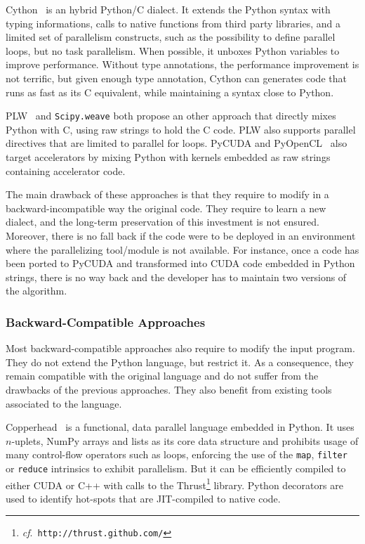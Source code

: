 \documentclass[conference]{IEEEtran}
\begin{document}
Cython~\cite{cython2010} is an hybrid Python/C dialect. It extends the Python
syntax with typing informations, calls to native functions from third party
libraries, and a limited set of parallelism constructs, such as the possibility
to define parallel loops, but no task parallelism. When possible, it unboxes
Python variables to improve performance. Without type annotations, the 
performance improvement is not terrific, but given enough type annotation, Cython can generates code that runs as fast as its C equivalent, while 
maintaining a syntax close to Python.

PLW~\cite{dongara2007} and \texttt{Scipy.weave} both propose an other approach
that directly mixes Python with C, using raw strings to hold the C code. PLW
also supports parallel directives that are limited to parallel for loops.
PyCUDA and PyOpenCL~\cite{klockner2012} also target accelerators by mixing
Python with kernels embedded as raw strings containing accelerator code.

The main drawback of these approaches is that they require to modify in a
backward-incompatible way the original code. They require to learn a new
dialect, and the long-term preservation of this investment is not ensured.
Moreover, there is no fall back if the code were to be deployed in an
environment where the parallelizing tool/module is not available. For instance,
once a code has been ported to PyCUDA and transformed into CUDA code embedded in
Python strings, there is no way back and the developer has to maintain two
versions of the algorithm.

\subsubsection{Backward-Compatible Approaches}

Most backward-compatible approaches also require to modify the input program.
They do not extend the Python language, but restrict it. As a consequence, they
remain compatible with the original language and do not suffer from the
drawbacks of the previous approaches. They also benefit from existing tools
associated to the language.

Copperhead~\cite{copperhead2011} is a functional, data parallel language
embedded in Python. It uses $n$-uplets, NumPy arrays and lists as its core data
structure and prohibits usage of many control-flow operators such as loops,
enforcing the use of the \texttt{map}, \texttt{filter} or \texttt{reduce}
intrinsics to exhibit parallelism. But it can be efficiently compiled to either
CUDA or C++ with calls to the Thrust\footnote{\emph{cf}.\
\texttt{http://thrust.github.com/}} library. Python decorators are used to
identify hot-spots that are JIT-compiled to native code.
\end{document}

